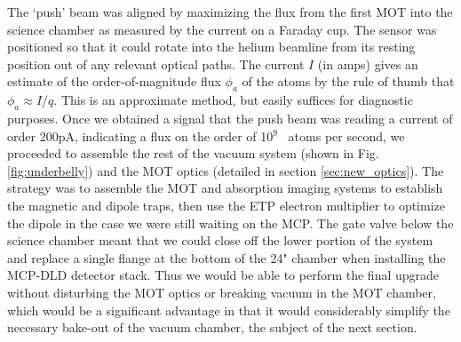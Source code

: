 	The `push' beam was aligned by maximizing the flux from the first MOT into the science chamber as measured by the current on a Faraday cup.
	The sensor was positioned so that it could rotate into the helium beamline from its resting position out of any relevant optical paths.
	The current $I$ (in amps) gives an estimate of the order-of-magnitude flux $\phi_a$ of the atoms by the rule of thumb that $\phi_a\approx I/q$.
	This is an approximate method, but easily suffices for diagnostic purposes.
	Once we obtained a signal that the push beam was reading a current of order 200pA, indicating a flux on the order of 10$^9$ \mhe~atoms per second, we proceeded to assemble the rest of the vacuum system (shown in Fig. \ref{fig:underbelly}) and the MOT optics (detailed in section \ref{sec:new_optics}).
	The strategy was to assemble the MOT and absorption imaging systems to establish the magnetic and dipole traps, then use the ETP electron multiplier to optimize the dipole in the case we were still waiting on the MCP.
	The gate valve below the science chamber meant that we could close off the lower portion of the system and replace a single flange at the bottom of the 24" chamber when installing the MCP-DLD detector stack.
	Thus we would be able to perform the final upgrade without disturbing the MOT optics or breaking vacuum in the MOT chamber, which would be a significant advantage in that it would considerably simplify the necessary bake-out of the vacuum chamber, the subject of the next section.
	

